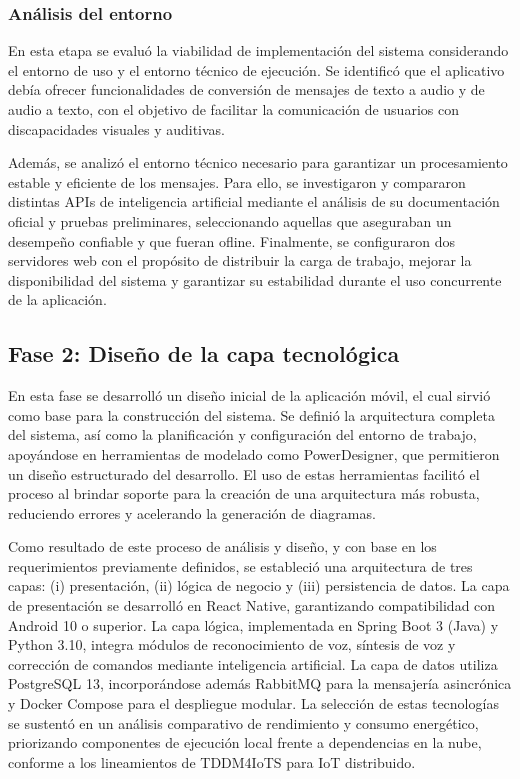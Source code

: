 \documentclass[lettersize,journal]{IEEEtran}
\begin{document}
        \subsubsection{Análisis del entorno}
        
       	En esta etapa se evaluó la viabilidad de implementación del sistema considerando el entorno de uso y el entorno técnico de ejecución. Se identificó que el aplicativo debía ofrecer funcionalidades de conversión de mensajes de texto a audio y de audio a texto, con el objetivo de facilitar la comunicación de usuarios con discapacidades visuales y auditivas.
       	
       	Además, se analizó el entorno técnico necesario para garantizar un procesamiento estable y eficiente de los mensajes. Para ello, se investigaron y compararon distintas APIs de inteligencia artificial mediante el análisis de su documentación oficial y pruebas preliminares, seleccionando aquellas que aseguraban un desempeño confiable y que fueran ofline. Finalmente, se configuraron dos servidores web con el propósito de distribuir la carga de trabajo, mejorar la disponibilidad del sistema y garantizar su estabilidad durante el uso concurrente de la aplicación.
       	
       	\subsection{Fase 2: Diseño de la capa tecnológica}
       	
       	En esta fase se desarrolló un diseño inicial de la aplicación móvil, el cual sirvió como base para la construcción del sistema. Se definió la arquitectura completa del sistema, así como la planificación y configuración del entorno de trabajo, apoyándose en herramientas de modelado como PowerDesigner, que permitieron un diseño estructurado del desarrollo. El uso de estas herramientas facilitó el proceso al brindar soporte para la creación de una arquitectura más robusta, reduciendo errores y acelerando la generación de diagramas.
       	
       	Como resultado de este proceso de análisis y diseño, y con base en los requerimientos previamente definidos, se estableció una arquitectura de tres capas: (i) presentación, (ii) lógica de negocio y (iii) persistencia de datos. La capa de presentación se desarrolló en React Native, garantizando compatibilidad con Android 10 o superior. La capa lógica, implementada en Spring Boot 3 (Java) y Python 3.10, integra módulos de reconocimiento de voz, síntesis de voz y corrección de comandos mediante inteligencia artificial. La capa de datos utiliza PostgreSQL 13, incorporándose además RabbitMQ para la mensajería asincrónica y Docker Compose para el despliegue modular. La selección de estas tecnologías se sustentó en un análisis comparativo de rendimiento y consumo energético, priorizando componentes de ejecución local frente a dependencias en la nube, conforme a los lineamientos de TDDM4IoTS para IoT distribuido.
       	
\end{document}
